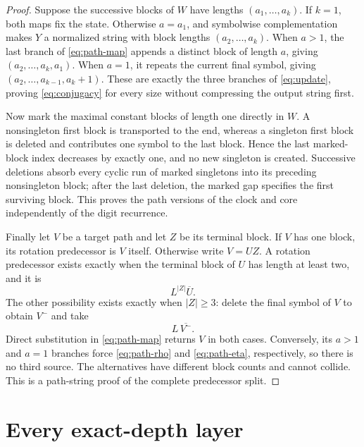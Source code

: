 \documentclass[10pt,a4paper]{amsart}
\theoremstyle{definition}
\theoremstyle{remark}
\begin{document}
\begin{proof}
Suppose the successive blocks of $W$ have lengths
$(a_1,\ldots,a_k)$.  If $k=1$, both maps fix the state.  Otherwise
$a=a_1$, and symbolwise complementation makes $Y$ a normalized string with
block lengths $(a_2,\ldots,a_k)$.  When $a>1$, the last branch of
\eqref{eq:path-map} appends a distinct block of length $a$, giving
$(a_2,\ldots,a_k,a_1)$.  When $a=1$, it repeats the current final symbol,
giving $(a_2,\ldots,a_{k-1},a_k+1)$.  These are exactly the three branches
of \eqref{eq:update}, proving \eqref{eq:conjugacy} for every size without
compressing the output string first.

Now mark the maximal constant blocks of length one directly in $W$.  A
nonsingleton first block is transported to the end, whereas a singleton first
block is deleted and contributes one symbol to the last block.  Hence the
last marked-block index decreases by exactly one, and no new singleton is
created.  Successive deletions absorb every cyclic run of marked singletons
into its preceding nonsingleton block; after the last deletion, the marked
gap specifies the first surviving block.  This proves the path versions of
the clock and core independently of the digit recurrence.

Finally let $V$ be a target path and let $Z$ be its terminal block.  If $V$
has one block, its rotation predecessor is $V$ itself.  Otherwise write
$V=UZ$.  A rotation predecessor exists exactly when the terminal block of
$U$ has length at least two, and it is
\begin{equation}
                         L^{|Z|}\overline U.            \label{eq:path-rho}
\end{equation}
The other possibility exists exactly when $|Z|\ge3$: delete the final symbol
of $V$ to obtain $V^-$ and take
\begin{equation}
                         L\,\overline{V^-}.             \label{eq:path-eta}
\end{equation}
Direct substitution in \eqref{eq:path-map} returns $V$ in both cases.
Conversely, its $a>1$ and $a=1$ branches force
\eqref{eq:path-rho} and \eqref{eq:path-eta}, respectively, so there is no
third source.  The alternatives have different block counts and cannot
collide.  This is a path-string proof of the complete predecessor split.
\end{proof}

\section{Every exact-depth layer}
\end{document}
